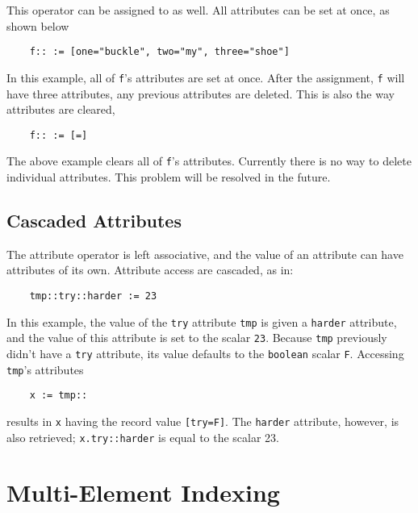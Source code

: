 This operator can be assigned to as well. All attributes can be
set at once, as shown below
\begin{verbatim}
    f:: := [one="buckle", two="my", three="shoe"]
\end{verbatim}
In this example, all of {\tt f}'s attributes are set at once. After the
assignment, {\tt f} will have three attributes, any previous attributes
are deleted. 
This is also the way attributes are cleared,
\begin{verbatim}
    f:: := [=]
\end{verbatim}
The above example clears all of {\tt f}'s attributes.  
Currently there is  no way to delete individual attributes. This problem
will be resolved in the future.

\subsection{Cascaded Attributes}
\label{attribute-cascading}

The attribute operator is left associative, and the value of an attribute can have
attributes of its own. Attribute access are cascaded, as in:
\begin{verbatim}
    tmp::try::harder := 23
\end{verbatim}
In this example, the value of the {\tt try} attribute {\tt tmp} is given a 
{\tt harder} attribute, and the value of this attribute is set to the scalar
{\tt 23}. Because {\tt tmp} previously didn't have a {\tt try}
attribute, its value
defaults to the {\tt boolean} scalar {\tt F}. Accessing {\tt tmp}'s attributes
\begin{verbatim}
    x := tmp::
\end{verbatim}
results in {\tt x} having the record value {\tt [try=F]}. The {\tt harder} attribute,
however, is also retrieved; {\tt x.try::harder} is equal to the scalar 23.


\section{Multi-Element Indexing}
\label{indexing}

